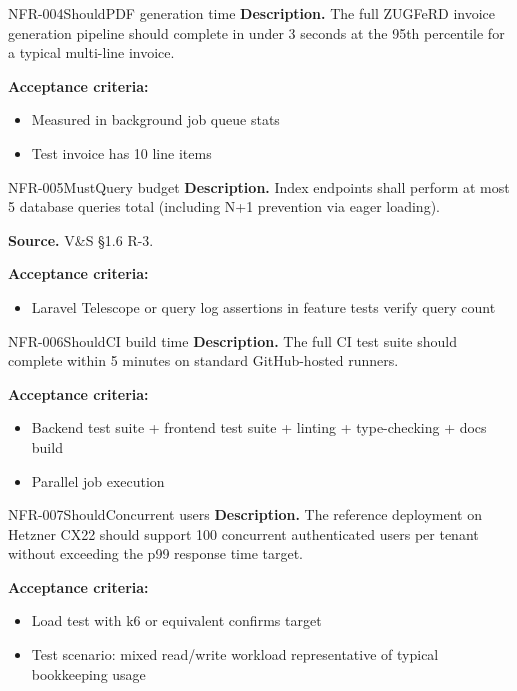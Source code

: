 \documentclass[11pt,a4paper]{article}
\begin{document}
\begin{requirement}{NFR-004}{Should}{PDF generation time}
\textbf{Description.} The full ZUGFeRD invoice generation pipeline should complete in under 3 seconds at the 95th percentile for a typical multi-line invoice.

\textbf{Acceptance criteria:}
\begin{itemize}
    \item Measured in background job queue stats
    \item Test invoice has 10 line items
\end{itemize}
\end{requirement}

\begin{requirement}{NFR-005}{Must}{Query budget}
\textbf{Description.} Index endpoints shall perform at most 5 database queries total (including N+1 prevention via eager loading).

\textbf{Source.} V\&S \S1.6 R-3.

\textbf{Acceptance criteria:}
\begin{itemize}
    \item Laravel Telescope or query log assertions in feature tests verify query count
\end{itemize}
\end{requirement}

\begin{requirement}{NFR-006}{Should}{CI build time}
\textbf{Description.} The full CI test suite should complete within 5 minutes on standard GitHub-hosted runners.

\textbf{Acceptance criteria:}
\begin{itemize}
    \item Backend test suite + frontend test suite + linting + type-checking + docs build
    \item Parallel job execution
\end{itemize}
\end{requirement}

\begin{requirement}{NFR-007}{Should}{Concurrent users}
\textbf{Description.} The reference deployment on Hetzner CX22 should support 100 concurrent authenticated users per tenant without exceeding the p99 response time target.

\textbf{Acceptance criteria:}
\begin{itemize}
    \item Load test with k6 or equivalent confirms target
    \item Test scenario: mixed read/write workload representative of typical bookkeeping usage
\end{itemize}
\end{requirement}
\end{document}
